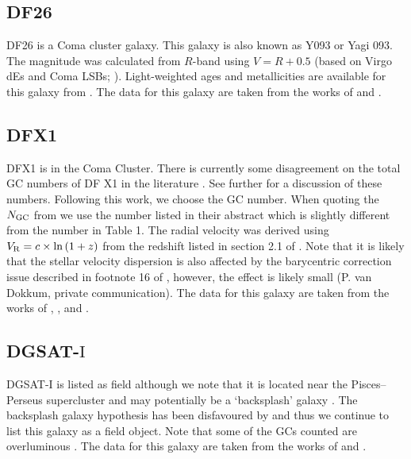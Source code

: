 \subsection{DF26}
DF26 is a Coma cluster galaxy. This galaxy is also known as Y093 or Yagi 093. The magnitude was calculated from $R$-band using $V = R + 0.5$ (based on Virgo dEs and Coma LSBs; \citealp{vanZee2004, Alabi2020}). Light-weighted ages and metallicities are available for this galaxy from \citet{RuizLara2018}. The data for this galaxy are taken from the works of \citet{Yagi2016, Alabi2018, Lim2018} and \citet{FerreMateu2018}. 

\subsection{DFX1}
DFX1 is in the Coma Cluster. There is currently some disagreement on the total GC numbers of DF X1 in the literature \citep{Saifollahi2021, Saifollahi2022}. See further \citet{Forbes2024} for a discussion of these numbers. Following this work, we choose the \citet{vanDokkum2017} GC number. When quoting the $N_{\rm GC}$ from \citet{vanDokkum2017} we use the number listed in their abstract which is slightly different from the number in Table 1. The radial velocity was derived using $V_{\rm R} = c \times \ln{(1+z)}$ from the redshift listed in section 2.1 of \cite{vanDokkum2017}. Note that it is likely that the stellar velocity dispersion is also affected by the barycentric correction issue described in footnote 16 of \cite{vanDokkum2019b}, however, the effect is likely small (P. van Dokkum, private communication). The data for this galaxy are taken from the works of \citet{vanDokkum2017}, \citet{Gannon2021}, \citet{Saifollahi2022} and \citet{FerreMateu2023}. 

\subsection{DGSAT-$\mathrm{I}$}
DGSAT-$\mathrm{I}$ is listed as field although we note that it is located near the Pisces--Perseus supercluster and may potentially be a `backsplash' galaxy \citep{MartinezDelgado2016, Papastergis2017, Benavides2021}. The backsplash galaxy hypothesis has been disfavoured by \citet{Janssens2022} and thus we continue to list this galaxy as a field object. Note that some of the GCs counted are overluminous \citep{Janssens2022}. The data for this galaxy are taken from the works of \citet{MartinezDelgado2016, MartinNavarro2019} and \citet{Janssens2022}. 


